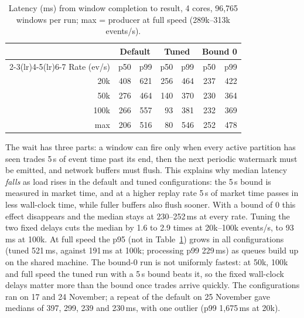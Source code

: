 \documentclass[sigconf]{acmart}
\begin{document}
\begin{table}[t]
  \caption{Latency (ms) from window completion to result, 4 cores, 96,765 windows per run; max = producer at full speed (289k--313k events/s).}
  \label{tab:lat}
  \small
  \setlength{\tabcolsep}{4pt}
  \begin{tabular}{rrrrrrr}
    \toprule
    & \multicolumn{2}{c}{Default} & \multicolumn{2}{c}{Tuned} & \multicolumn{2}{c}{Bound 0}\\
    \cmidrule(lr){2-3}\cmidrule(lr){4-5}\cmidrule(lr){6-7}
    Rate (ev/s) & p50 & p99 & p50 & p99 & p50 & p99\\
    \midrule
     20k & 408 & 621 & 256 & 464 & 237 & 422\\
     50k & 276 & 464 & 140 & 370 & 230 & 364\\
    100k & 266 & 557 &  93 & 381 & 232 & 369\\
     max & 206 & 516 &  80 & 546 & 252 & 478\\
    \bottomrule
  \end{tabular}
\end{table}

The wait has three parts: a window can fire only when every active partition has seen trades 5\,s of event time past its end, then the next periodic watermark must be emitted, and network buffers must flush. This explains why median latency \emph{falls} as load rises in the default and tuned configurations: the 5\,s bound is measured in market time, and at a higher replay rate 5\,s of market time passes in less wall-clock time, while fuller buffers also flush sooner. With a bound of 0 this effect disappears and the median stays at 230--252\,ms at every rate. Tuning the two fixed delays cuts the median by 1.6 to 2.9 times at 20k--100k events/s, to 93\,ms at 100k. At full speed the p95 (not in Table~\ref{tab:lat}) grows in all configurations (tuned 521\,ms, against 191\,ms at 100k; processing p99 229\,ms) as queues build up on the shared machine. The bound-0 run is not uniformly fastest: at 50k, 100k and full speed the tuned run with a 5\,s bound beats it, so the fixed wall-clock delays matter more than the bound once trades arrive quickly. The configurations ran on 17 and 24 November; a repeat of the default on 25 November gave medians of 397, 299, 239 and 230\,ms, with one outlier (p99 1,675\,ms at 20k).
\end{document}
